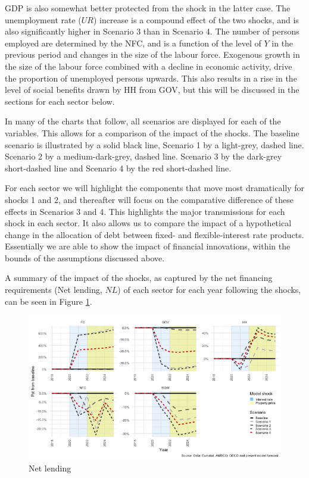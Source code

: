 \documentclass[
]{book}
\begin{document}
GDP is also somewhat better protected from the shock in the latter case. The unemployment rate (\(UR\)) increase is a compound effect of the two shocks, and is also significantly higher in Scenario 3 than in Scenario 4. The number of persons employed are determined by the NFC, and is a function of the level of \(Y\) in the previous period and changes in the size of the labour force. Exogenous growth in the size of the labour force combined with a decline in economic activity, drive the proportion of unemployed persons upwards. This also results in a rise in the level of social benefits drawn by HH from GOV, but this will be discussed in the sections for each sector below.

In many of the charts that follow, all scenarios are displayed for each of the variables. This allows for a comparison of the impact of the shocks. The baseline scenario is illustrated by a solid black line, Scenario 1 by a light-grey, dashed line. Scenario 2 by a medium-dark-grey, dashed line. Scenario 3 by the dark-grey short-dashed line and Scenario 4 by the red short-dashed line.

For each sector we will highlight the components that move most dramatically for shocks 1 and 2, and thereafter will focus on the comparative difference of these effects in Scenarios 3 and 4. This highlights the major transmissions for each shock in each sector. It also allows us to compare the impact of a hypothetical change in the allocation of debt between fixed- and flexible-interest rate products. Essentially we are able to show the impact of financial innovations, within the bounds of the assumptions discussed above.

A summary of the impact of the shocks, as captured by the net financing requirements (Net lending, \(NL\)) of each sector for each year following the shocks, can be seen in Figure \ref{fig:fl-fi-sfc-plot-nl-S1-S4}.

\begin{figure}[H]
\includegraphics[width=0.95\linewidth]{figures/fl-fi-sfc-plot-nl-S1-S4-1} \caption{Net lending}\label{fig:fl-fi-sfc-plot-nl-S1-S4}
\end{figure}
\end{document}
